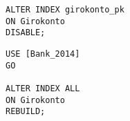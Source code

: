 \begin{enumerate}
\begin{lstlisting}[language=ms_sql]
ALTER INDEX girokonto_pk
ON Girokonto
DISABLE;
        \end{lstlisting}
\clearpage
        
        \begin{lstlisting}[language=ms_sql]
USE [Bank_2014]
GO

ALTER INDEX ALL
ON Girokonto
REBUILD;
        \end{lstlisting}

        
      \end{enumerate}